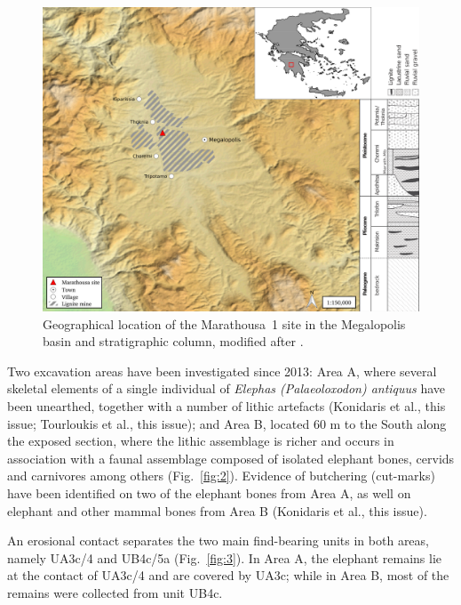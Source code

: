 \documentclass[review,authoryear,times]{elsarticle} %
\begin{document}
\begin{figure}[]
  \centering
  \includegraphics[width=1\textwidth]{../artwork/Fig1.png} %
  \caption{Geographical location of the Marathousa~1 site in the Megalopolis basin and stratigraphic column, modified after \cite{Vugt2000}.}
  \label{fig:1}
\end{figure}

Two excavation areas have been investigated since 2013: Area A, where several skeletal elements of a single individual of \emph{Elephas (Palaeoloxodon) antiquus} have been unearthed, together with a number of lithic artefacts (Konidaris et al., this issue; Tourloukis et al., this issue); and Area B, located 60 m to the South along the exposed section, where the lithic assemblage is richer and occurs in association with a faunal assemblage composed of isolated elephant bones, cervids and carnivores among others (Fig.~\ref{fig:2}). Evidence of butchering (cut-marks) have been identified on two of the elephant bones from Area A, as well on elephant and other mammal bones from Area B (Konidaris et al., this issue).


An erosional contact separates the two main find-bearing units in both areas, namely UA3c/4 and UB4c/5a (Fig.~\ref{fig:3}). In Area A, the elephant remains lie at the contact of UA3c/4 and are covered by UA3c; while in Area B, most of the remains were collected from unit UB4c. %
\end{document}
